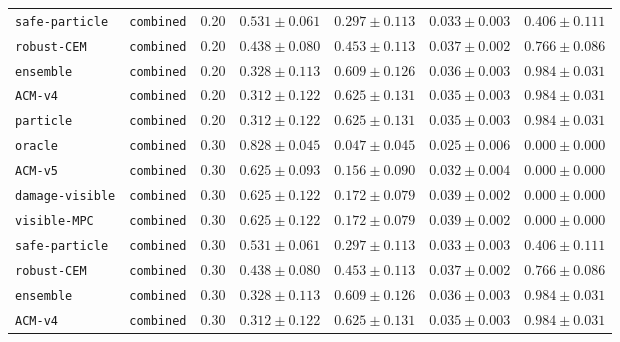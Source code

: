 \documentclass{article}
\begin{document}
\begin{center}
\begin{tabular}{llccccc}
\texttt{safe-particle} & \texttt{combined} & 0.20 & $0.531 \pm 0.061$ & $0.297 \pm 0.113$ & $0.033 \pm 0.003$ & $0.406 \pm 0.111$ \\
\texttt{robust-CEM} & \texttt{combined} & 0.20 & $0.438 \pm 0.080$ & $0.453 \pm 0.113$ & $0.037 \pm 0.002$ & $0.766 \pm 0.086$ \\
\texttt{ensemble} & \texttt{combined} & 0.20 & $0.328 \pm 0.113$ & $0.609 \pm 0.126$ & $0.036 \pm 0.003$ & $0.984 \pm 0.031$ \\
\texttt{ACM-v4} & \texttt{combined} & 0.20 & $0.312 \pm 0.122$ & $0.625 \pm 0.131$ & $0.035 \pm 0.003$ & $0.984 \pm 0.031$ \\
\texttt{particle} & \texttt{combined} & 0.20 & $0.312 \pm 0.122$ & $0.625 \pm 0.131$ & $0.035 \pm 0.003$ & $0.984 \pm 0.031$ \\
\texttt{oracle} & \texttt{combined} & 0.30 & $0.828 \pm 0.045$ & $0.047 \pm 0.045$ & $0.025 \pm 0.006$ & $0.000 \pm 0.000$ \\
\texttt{ACM-v5} & \texttt{combined} & 0.30 & $0.625 \pm 0.093$ & $0.156 \pm 0.090$ & $0.032 \pm 0.004$ & $0.000 \pm 0.000$ \\
\texttt{damage-visible} & \texttt{combined} & 0.30 & $0.625 \pm 0.122$ & $0.172 \pm 0.079$ & $0.039 \pm 0.002$ & $0.000 \pm 0.000$ \\
\texttt{visible-MPC} & \texttt{combined} & 0.30 & $0.625 \pm 0.122$ & $0.172 \pm 0.079$ & $0.039 \pm 0.002$ & $0.000 \pm 0.000$ \\
\texttt{safe-particle} & \texttt{combined} & 0.30 & $0.531 \pm 0.061$ & $0.297 \pm 0.113$ & $0.033 \pm 0.003$ & $0.406 \pm 0.111$ \\
\texttt{robust-CEM} & \texttt{combined} & 0.30 & $0.438 \pm 0.080$ & $0.453 \pm 0.113$ & $0.037 \pm 0.002$ & $0.766 \pm 0.086$ \\
\texttt{ensemble} & \texttt{combined} & 0.30 & $0.328 \pm 0.113$ & $0.609 \pm 0.126$ & $0.036 \pm 0.003$ & $0.984 \pm 0.031$ \\
\texttt{ACM-v4} & \texttt{combined} & 0.30 & $0.312 \pm 0.122$ & $0.625 \pm 0.131$ & $0.035 \pm 0.003$ & $0.984 \pm 0.031$ \\
\bottomrule
\end{tabular}
\end{center}
\end{document}

